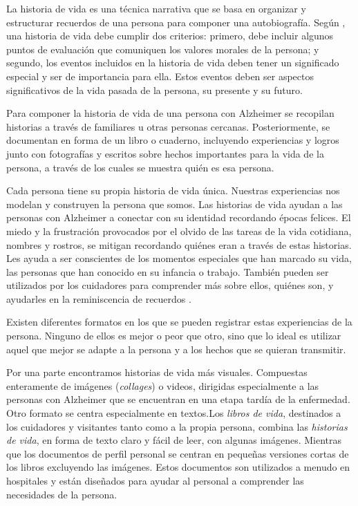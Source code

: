 La historia de vida es una técnica narrativa que se basa en organizar y estructurar recuerdos de una persona para componer una autobiografía. Según \cite{linde1993life}, una historia de vida debe cumplir dos criterios: primero, debe incluir algunos puntos de evaluación que comuniquen los valores morales de la persona; y segundo, los eventos incluidos en la historia de vida deben tener un significado especial y ser de importancia para ella. Estos eventos deben ser aspectos significativos de la vida pasada de la persona, su presente y su futuro.

Para componer la historia de vida de una persona con Alzheimer se recopilan historias a través de familiares u otras personas cercanas. Posteriormente, se documentan en forma de un libro o cuaderno, incluyendo experiencias y logros junto con fotografías y escritos sobre hechos importantes para la vida de la persona, a través de los cuales se muestra quién es esa persona.

Cada persona tiene su propia historia de vida única. Nuestras experiencias nos modelan y construyen la persona que somos. Las historias de vida ayudan a las personas con Alzheimer a conectar con su identidad recordando épocas felices. El miedo y la frustración provocados por el olvido de las tareas de la vida cotidiana, nombres y rostros, se mitigan recordando quiénes eran a través de estas historias. Les ayuda a ser conscientes de los momentos especiales que han marcado su vida, las personas que han conocido en su infancia o trabajo. También pueden ser utilizados por los cuidadores para comprender más sobre ellos, quiénes son, y ayudarles en la reminiscencia de recuerdos \citep{karlsson2014stories}.


Existen diferentes formatos en los que se pueden registrar estas experiencias de la persona. Ninguno de ellos es mejor o peor que otro, sino que lo ideal es utilizar aquel que mejor se adapte a la persona y a los hechos que se quieran transmitir.

Por una parte encontramos historias de vida más visuales. Compuestas enteramente de imágenes (\textit{collages}) o videos, dirigidas especialmente a las personas con Alzheimer que se encuentran en una etapa tardía de la enfermedad. Otro formato se centra especialmente en textos.Los \textit{libros de vida}, destinados a los cuidadores y visitantes tanto como a la propia persona, combina las \textit{historias de vida}, en forma de texto claro y fácil de leer, con algunas imágenes. Mientras que los documentos de perfil personal se centran en pequeñas versiones cortas de los libros excluyendo las imágenes. Estos documentos son utilizados a menudo en hospitales y están diseñados para ayudar al personal a comprender las necesidades de la persona.

